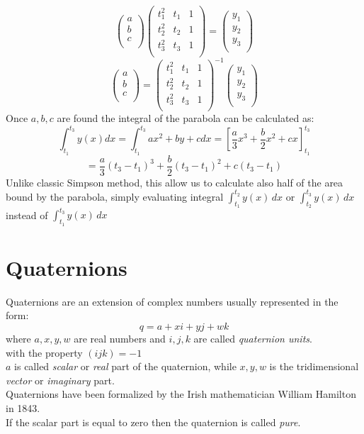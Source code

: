 $$ 
\begin{pmatrix}
a \\
b \\
c \\
\end{pmatrix}
\begin{pmatrix}
t_1^2 & t_1 & 1 \\
t_2^2 & t_2 & 1 \\
t_3^2 & t_3 & 1 \\
\end{pmatrix}
=
\begin{pmatrix}
y_1 \\
y_2 \\
y_3 \\
\end{pmatrix}
$$
$$ 
\begin{pmatrix}
a \\
b \\
c \\
\end{pmatrix}
=
\begin{pmatrix}
t_1^2 & t_1 & 1 \\
t_2^2 & t_2 & 1 \\
t_3^2 & t_3 & 1 \\
\end{pmatrix}^{-1}
\begin{pmatrix}
y_1 \\
y_2 \\
y_3 \\
\end{pmatrix}
$$
Once $a,b,c$ are found the integral of the parabola can be calculated as:
$$
\int_{t_1}^{t_3} y(x)dx = \int_{t_1}^{t_3} ax^2 + by + c dx = \left[\frac{a}{3}x^3+\frac{b}{2}x^2+c{x}\right]_{t_1}^{t_3} 
$$
$$= \frac{a}{3}(t_3-t_1)^3+\frac{b}{2}(t_3-t_1)^2+c(t_3-t_1)$$
Unlike classic Simpson method, this allow us to calculate also half of the area bound by the parabola, simply evaluating integral $\int_{t_1}^{t_2} y(x)\,dx$ or $\int_{t_2}^{t_3} y(x)\,dx$ instead of $\int_{t_1}^{t_3} y(x)\,dx $

\section{Quaternions}
Quaternions are an extension of complex numbers usually represented in the form:
$$ q = a + xi + yj + wk $$
where $a, x, y, w$ are real numbers and $i, j, k$ are called \textit{quaternion units}. \\
with the property ${(ijk)=-1}$  \\
$a$ is called \textit{scalar} or \textit{real} part of the quaternion, while $x,y,w$ is the tridimensional \textit{vector} or \textit{imaginary} part. \cite{amslaurea6701} \\
Quaternions have been formalized by the Irish mathematician William Hamilton in 1843. \\
If the scalar part is equal to zero then the quaternion is called \textit{pure}.

